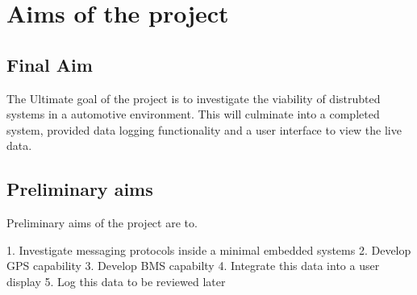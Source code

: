 
\chapter{Aims of the project} %



\section{Final Aim}

The Ultimate goal of the project is to investigate the viability of distrubted systems in a automotive environment. This will culminate into a completed system, provided data logging functionality and a user interface to view the live data. 

\section{Preliminary aims}

Preliminary aims of the project are to.

1. Investigate messaging protocols inside a minimal embedded systems
2. Develop GPS capability
3. Develop BMS capabilty
4. Integrate this data into a user display
5. Log this data to be reviewed later



